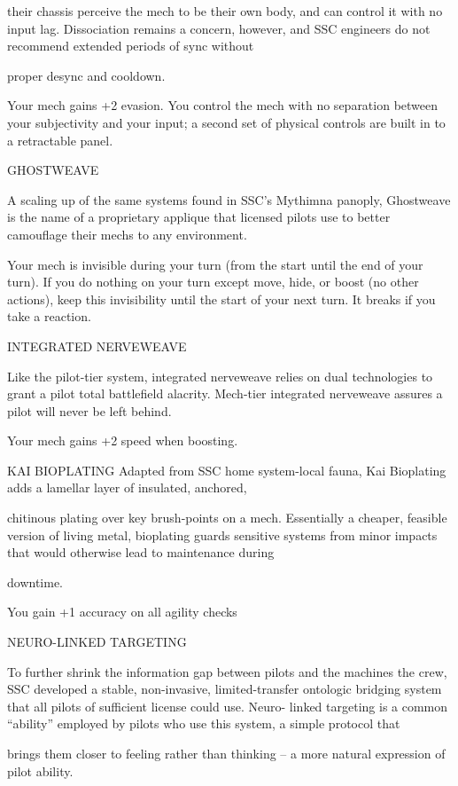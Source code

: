 their chassis perceive the mech to be their own body, and can control it with no input lag. Dissociation  
remains a concern, however, and SSC engineers do not recommend extended periods of sync without  

proper desync and cooldown.   

Your mech gains +2 evasion. You control the mech with no separation between your subjectivity  
and your input; a second set of physical controls are built in to a retractable panel. 
 

GHOSTWEAVE  

A scaling up of the same systems found in SSC’s Mythimna panoply, Ghostweave is the name of a  
proprietary applique that licensed pilots use to better camouflage their mechs to any environment.   

Your mech is invisible during your turn (from the start until the end of your turn). If you do nothing  
on your turn except move, hide, or boost (no other actions), keep this invisibility until the start of  
your next turn. It breaks if you take a reaction.
 

INTEGRATED NERVEWEAVE  

Like the pilot-tier system, integrated nerveweave relies on dual technologies to grant a pilot total battlefield  
alacrity. Mech-tier integrated nerveweave assures a pilot will never be left behind.   

Your mech gains +2 speed when boosting.
 

KAI BIOPLATING  
Adapted from SSC home system-local fauna, Kai Bioplating adds a lamellar layer of insulated, anchored,  

chitinous plating over key brush-points on a mech. Essentially a cheaper, feasible version of living metal,  
bioplating guards sensitive systems from minor impacts that would otherwise lead to maintenance during  

downtime.   

You gain +1 accuracy on all agility checks
 

NEURO-LINKED TARGETING  

To further shrink the information gap between pilots and the machines the crew, SSC developed a stable,  
non-invasive, limited-transfer ontologic bridging system that all pilots of sufficient license could use. Neuro- 
linked targeting is a common “ability” employed by pilots who use this system, a simple protocol that  

brings them closer to feeling rather than thinking -- a more natural expression of pilot ability.     

